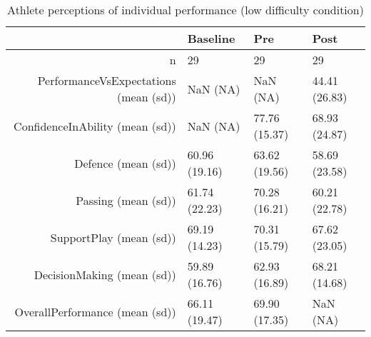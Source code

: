 \begin{table}[ht]
\centering
\begin{tabular}{rlll}
  \hline
 & Baseline & Pre & Post \\ 
  \hline
n &    29 &    29 &    29 \\ 
  PerformanceVsExpectations (mean (sd)) &   NaN (NA) &   NaN (NA) & 44.41 (26.83) \\ 
  ConfidenceInAbility (mean (sd)) &   NaN (NA) & 77.76 (15.37) & 68.93 (24.87) \\ 
  Defence (mean (sd)) & 60.96 (19.16) & 63.62 (19.56) & 58.69 (23.58) \\ 
  Passing (mean (sd)) & 61.74 (22.23) & 70.28 (16.21) & 60.21 (22.78) \\ 
  SupportPlay (mean (sd)) & 69.19 (14.23) & 70.31 (15.79) & 67.62 (23.05) \\ 
  DecisionMaking (mean (sd)) & 59.89 (16.76) & 62.93 (16.89) & 68.21 (14.68) \\ 
  OverallPerformance (mean (sd)) & 66.11 (19.47) & 69.90 (17.35) &   NaN (NA) \\ 
   \hline
\end{tabular}
\caption{Athlete perceptions of 
 individual performance (low difficulty condition)} 
\label{tab:indPerfTimeHighTraining}
\end{table}
